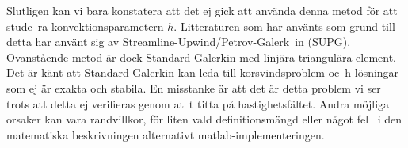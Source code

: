 Slutligen kan vi bara konstatera att det ej gick att använda denna metod för att stude\
ra konvektionsparametern $h$. Litteraturen
som har använts som grund till detta har använt sig av Streamline-Upwind/Petrov-Galerk\
in (SUPG). \cite{heinrich88}\cite{roy05} Ovanstående metod är dock
Standard Galerkin med linjära triangulära element. Det är känt att Standard Galerkin kan leda till korsvindsproblem oc\
h lösningar som ej är
exakta och stabila.\cite{segal2011}
En misstanke är att det är detta problem vi ser trots att detta ej verifieras genom at\
t titta på hastighetsfältet. Andra
möjliga orsaker kan vara randvillkor, för liten vald definitionsmängd eller något fel \
i den matematiska beskrivningen alternativt
matlab-implementeringen.
